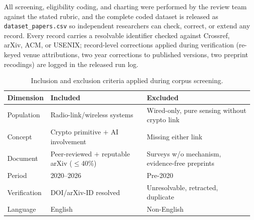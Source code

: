All screening, eligibility coding, and charting were performed by the review team against the stated rubric, and the complete coded dataset is released as \texttt{dataset\_papers.csv} so independent researchers can check, correct, or extend any record. Every record carries a resolvable identifier checked against Crossref, arXiv, ACM, or USENIX; record-level corrections applied during verification (re-keyed venue attributions, two year corrections to published versions, two preprint recodings) are logged in the released run log.

\begin{table}[tbp]
\centering
\caption{Inclusion and exclusion criteria applied during corpus screening.}
\label{tab:criteria}
\begin{tabular}{@{}p{2.2cm} p{5.5cm} p{6.0cm}@{}}
\toprule
Dimension & Included & Excluded \\
\midrule
Population & Radio-link/wireless systems & Wired-only, pure sensing without crypto link \\
Concept & Crypto primitive $+$ AI involvement & Missing either link \\
Document & Peer-reviewed $+$ reputable arXiv ($\le$40\%) & Surveys w/o mechanism, evidence-free preprints \\
Period & 2020--2026 & Pre-2020 \\
Verification & DOI/arXiv-ID resolved & Unresolvable, retracted, duplicate \\
Language & English & Non-English \\
\bottomrule
\end{tabular}
\end{table}

